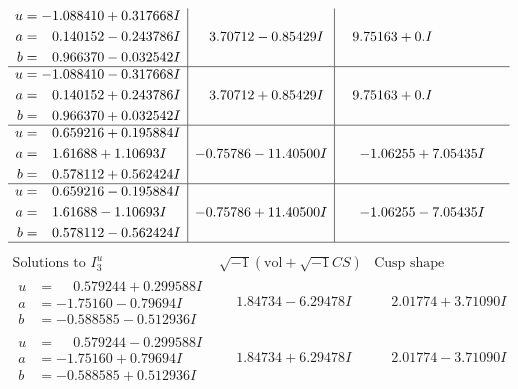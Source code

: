 \documentclass[1p]{elsarticle_modified}
\theoremstyle{definition}
\newcommand{\I}{\sqrt{-1}}
\begin{document}
$$\begin{array}{c|c|c}
\begin{aligned}
u &= -1.088410 + 0.317668 I \\
a &= \phantom{-}0.140152 - 0.243786 I \\
b &= \phantom{-}0.966370 - 0.032542 I\end{aligned}
 & \phantom{-}3.70712 - 0.85429 I & \phantom{-}9.75163 + 0. I\phantom{ +0.000000I} \\ \hline\begin{aligned}
u &= -1.088410 - 0.317668 I \\
a &= \phantom{-}0.140152 + 0.243786 I \\
b &= \phantom{-}0.966370 + 0.032542 I\end{aligned}
 & \phantom{-}3.70712 + 0.85429 I & \phantom{-}9.75163 + 0. I\phantom{ +0.000000I} \\ \hline\begin{aligned}
u &= \phantom{-}0.659216 + 0.195884 I \\
a &= \phantom{-}1.61688 + 1.10693 I \\
b &= \phantom{-}0.578112 + 0.562424 I\end{aligned}
 & -0.75786 - 11.40500 I & -1.06255 + 7.05435 I \\ \hline\begin{aligned}
u &= \phantom{-}0.659216 - 0.195884 I \\
a &= \phantom{-}1.61688 - 1.10693 I \\
b &= \phantom{-}0.578112 - 0.562424 I\end{aligned}
 & -0.75786 + 11.40500 I & -1.06255 - 7.05435 I\\
 \hline 
 \end{array}$$\newpage$$\begin{array}{c|c|c}  
\text{Solutions to }I^u_{3}& \I (\text{vol} + \sqrt{-1}CS) & \text{Cusp shape}\\
 \hline 
\begin{aligned}
u &= \phantom{-}0.579244 + 0.299588 I \\
a &= -1.75160 - 0.79694 I \\
b &= -0.588585 - 0.512936 I\end{aligned}
 & \phantom{-}1.84734 - 6.29478 I & \phantom{-}2.01774 + 3.71090 I \\ \hline\begin{aligned}
u &= \phantom{-}0.579244 - 0.299588 I \\
a &= -1.75160 + 0.79694 I \\
b &= -0.588585 + 0.512936 I\end{aligned}
 & \phantom{-}1.84734 + 6.29478 I & \phantom{-}2.01774 - 3.71090 I \\ \hline\begin{aligned}

\end{aligned}
\end{array}$$
\end{document}
